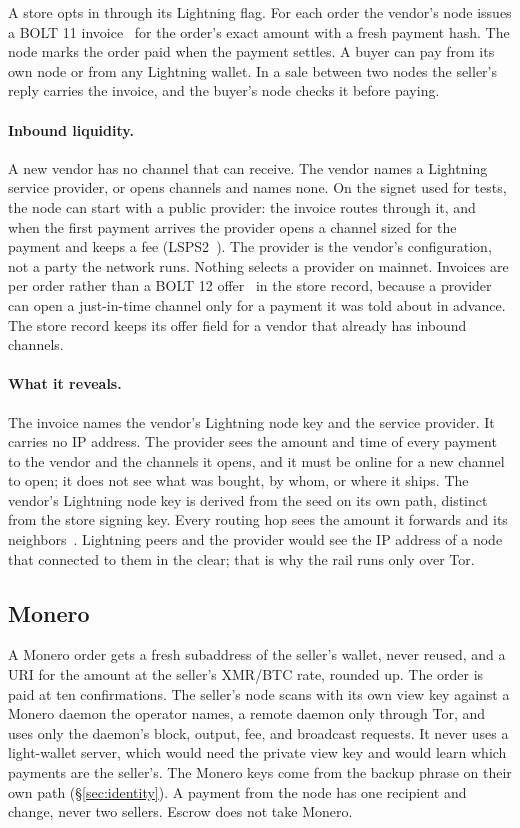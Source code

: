 A store opts in through its Lightning flag. For each order the vendor's node issues a BOLT 11 invoice~\citep{bolt11} for the order's exact amount with a fresh payment hash. The node marks the order paid when the payment settles. A buyer can pay from its own node or from any Lightning wallet. In a sale between two nodes the seller's reply carries the invoice, and the buyer's node checks it before paying.

\paragraph{Inbound liquidity.} A new vendor has no channel that can receive. The vendor names a Lightning service provider, or opens channels and names none. On the signet used for tests, the node can start with a public provider: the invoice routes through it, and when the first payment arrives the provider opens a channel sized for the payment and keeps a fee (LSPS2~\citep{lsps2}). The provider is the vendor's configuration, not a party the network runs. Nothing selects a provider on mainnet. Invoices are per order rather than a BOLT 12 offer~\citep{bolt12} in the store record, because a provider can open a just-in-time channel only for a payment it was told about in advance. The store record keeps its offer field for a vendor that already has inbound channels.

\paragraph{What it reveals.} The invoice names the vendor's Lightning node key and the service provider. It carries no IP address. The provider sees the amount and time of every payment to the vendor and the channels it opens, and it must be online for a new channel to open; it does not see what was bought, by whom, or where it ships. The vendor's Lightning node key is derived from the seed on its own path, distinct from the store signing key. Every routing hop sees the amount it forwards and its neighbors~\citep{kappos2021lightning}. Lightning peers and the provider would see the IP address of a node that connected to them in the clear; that is why the rail runs only over Tor.

\subsection{Monero}

A Monero order gets a fresh subaddress of the seller's wallet, never reused, and a  URI for the amount at the seller's XMR/BTC rate, rounded up. The order is paid at ten confirmations. The seller's node scans with its own view key against a Monero daemon the operator names, a remote daemon only through Tor, and uses only the daemon's block, output, fee, and broadcast requests. It never uses a light-wallet server, which would need the private view key and would learn which payments are the seller's. The Monero keys come from the backup phrase on their own path (\S\ref{sec:identity}). A payment from the node has one recipient and change, never two sellers. Escrow does not take Monero.

